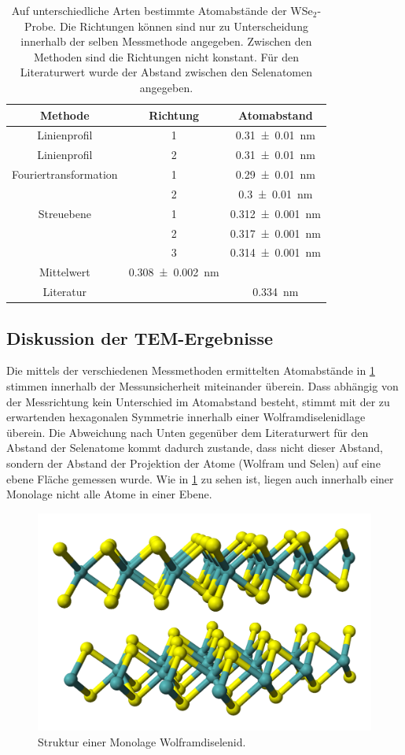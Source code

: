 	\begin{table}
		\centering
		\caption{Auf unterschiedliche Arten bestimmte Atomabstände der WSe$_2$-Probe. Die Richtungen können sind nur zu Unterscheidung innerhalb der selben Messmethode angegeben. Zwischen den Methoden sind die Richtungen nicht konstant.
    Für den Literaturwert wurde der Abstand zwischen den Selenatomen angegeben.}
		\begin{tabular}{c| c | c}
			Methode & Richtung & Atomabstand \\ \hline
      Linienprofil &  1 & \SI{0.31 \pm 0.01}{nm}\\
      Linienprofil &  2 & \SI{0.31 \pm 0.01}{nm}\\
      Fouriertransformation & 1 & \SI{0.29 \pm 0.01}{nm}\\
      & 2 & \SI{0.3 \pm 0.01}{nm}\\
      Streuebene & 1 & \SI{0,312 \pm 0.001}{nm} \\
      & 2 & \SI{0,317 \pm 0.001}{nm} \\
      & 3 & \SI{0,314 \pm 0.001}{nm} \\
      Mittelwert & \SI{0,308 \pm 0.002}{nm}& \\
      Literatur & & \SI{0,334}{nm} \cite{wiki_wse}\\
		\end{tabular}
		\label{tab:netz}
	\end{table}

\subsection{Diskussion der TEM-Ergebnisse}

  Die mittels der verschiedenen Messmethoden ermittelten Atomabstände in \cref{tab:netz} stimmen innerhalb der Messunsicherheit miteinander überein.
  Dass abhängig von der Messrichtung kein Unterschied im Atomabstand besteht, stimmt mit der zu erwartenden hexagonalen Symmetrie innerhalb einer Wolframdiselenidlage überein.
  Die Abweichung nach Unten gegenüber dem Literaturwert für den Abstand der Selenatome kommt dadurch zustande, dass nicht dieser Abstand, sondern der Abstand der Projektion der Atome (Wolfram und Selen) auf eine ebene Fläche gemessen wurde.
  Wie in \cref{fig:strukt} zu sehen ist, liegen auch innerhalb einer Monolage nicht alle Atome in einer Ebene.

	\begin{figure}[H]
  \centering
			\includegraphics[width= 0.4 \linewidth]{img/strukt}
			\caption{
        Struktur einer Monolage Wolframdiselenid. \cite{wiki_wse_bild}
			}
			\label{fig:strukt}
	\end{figure}

